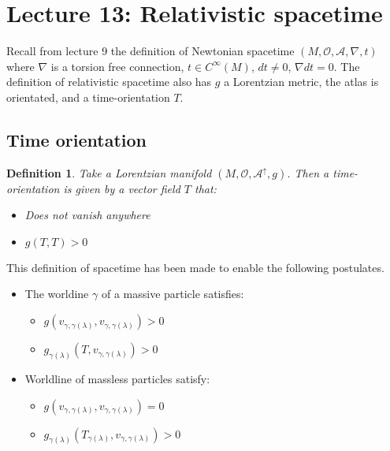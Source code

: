 \documentclass[10pt, oneside]{article}
\newtheorem{defn}{Definition}
\begin{document}
\section{Lecture 13: Relativistic spacetime \cite{Spacetime}}
Recall from lecture 9 the definition of Newtonian spacetime $(M,\mathcal{O},\mathcal{A},\nabla,t)$ where $\nabla$ is a torsion free connection, $t \in C^\infty (M)$, $dt \not = 0$, $\nabla dt = 0$.
The definition of relativistic spacetime also has $g$ a Lorentzian metric, the atlas is orientated, and a time-orientation $T$.
\subsection{Time orientation}
\begin{defn}
Take a Lorentzian manifold $(M, \mathcal{O}, \mathcal{A}^\uparrow, g)$. Then a time-orientation is given by a vector field $T$ that:
\begin{itemize}
\item Does not vanish anywhere
\item $g(T,T) > 0$
\end{itemize}
\end{defn}
This definition of spacetime has been made to enable the following postulates.
\begin{itemize}
\item The worldine $\gamma$ of a massive particle satisfies:
\begin{itemize}
\item $g(v_{\gamma,\gamma(\lambda)},v_{\gamma,\gamma(\lambda)})>0$
\item $g_{\gamma(\lambda)}(T,v_{\gamma,\gamma(\lambda)})>0$
\end{itemize}
\item Worldline of massless particles satisfy:
\begin{itemize}
\item $g(v_{\gamma,\gamma(\lambda)},v_{\gamma,\gamma(\lambda)})=0$
\item $g_{\gamma(\lambda)}(T_{\gamma(\lambda)},v_{\gamma,\gamma(\lambda)})>0$
\end{itemize}
\end{itemize}
\end{document}
